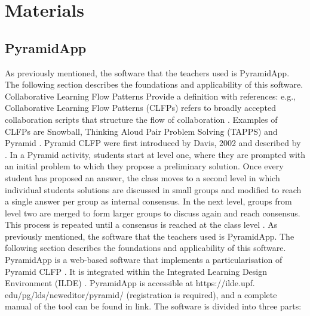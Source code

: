 \section{Materials}
\subsection{PyramidApp}
As previously mentioned, the software that the teachers used is PyramidApp. The following section describes the foundations and applicability of this software.
Collaborative Learning Flow Patterns Provide a definition with references: e.g., Collaborative Learning Flow Patterns (CLFPs) refers to broadly accepted collaboration scripts that structure the flow of collaboration \cite{hernandez-leo_villasclaras-fernandez}. Examples of CLFPs are Snowball, Thinking Aloud Pair Problem Solving (TAPPS) and Pyramid \cite{Manathunga2018-uu}. Pyramid CLFP were first introduced by Davis, 2002 and described by \cite{Hernandez-leo2006-lv}. In a Pyramid activity, students start at level one, where they are prompted with an initial problem to which they propose a preliminary solution. Once every student has proposed an answer, the class moves to a second level in which individual students solutions are discussed in small groups and modified to reach a single answer per group as internal consensus. In the next level, groups from level two are merged to form larger groups to discuss again and reach consensus. This process is repeated until a consensus is reached at the class level \cite{Manathunga2018-uu}.
As previously mentioned, the software that the teachers used is PyramidApp. The following section describes the foundations and applicability of this software.
PyramidApp is a web-based software that implements a particularisation of Pyramid CLFP \cite{Manathunga2018-uu}. It is integrated within the Integrated Learning Design Environment (ILDE) \cite{ILDE}. PyramidApp is accessible at https://ilde.upf. edu/pg/lds/neweditor/pyramid/ (registration is required), and a complete manual of the tool can be found in link. The software is divided into three parts:
